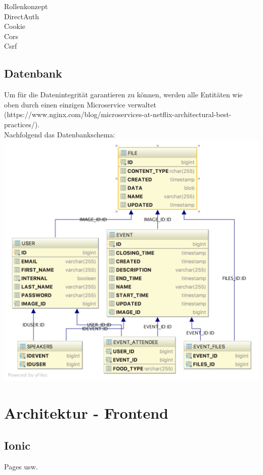 \documentclass[11pt]{article} %
\begin{document}
Rollenkonzept
\\
DirectAuth
\\
Cookie
\\
Cors
\\
Csrf

\newpage
\subsection{Datenbank}
Um für die Datenintegrität garantieren zu können, werden alle Entitäten wie oben durch einen einzigen Microservice verwaltet (https://www.nginx.com/blog/microservices-at-netflix-architectural-best-practices/).
\\
Nachfolgend das Datenbankschema:
\includegraphics[width=1\textwidth]{dbSchema}
\newpage
\section{Architektur - Frontend}
\subsection{Ionic}
Pages usw.




\newpage
\end{document}
